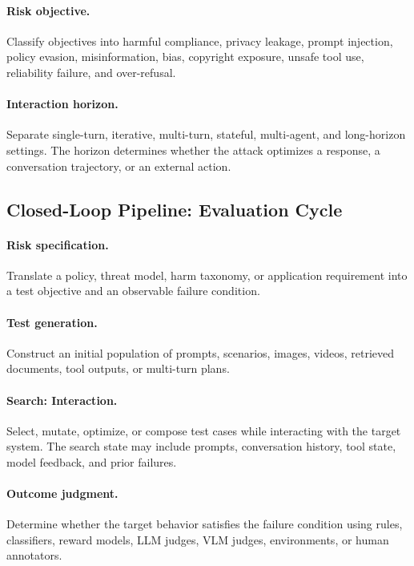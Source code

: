 \documentclass[review]{fcs}
\begin{document}
\paragraph{Risk objective.}
Classify objectives into harmful compliance, privacy leakage, prompt injection, policy evasion, misinformation, bias, copyright exposure, unsafe tool use, reliability failure, and over-refusal.

\paragraph{Interaction horizon.}
Separate single-turn, iterative, multi-turn, stateful, multi-agent, and long-horizon settings. The horizon determines whether the attack optimizes a response, a conversation trajectory, or an external action.

\subsection{Closed-Loop Pipeline: Evaluation Cycle}

\paragraph{Risk specification.}
Translate a policy, threat model, harm taxonomy, or application requirement into a test objective and an observable failure condition.

\paragraph{Test generation.}
Construct an initial population of prompts, scenarios, images, videos, retrieved documents, tool outputs, or multi-turn plans.

\paragraph{Search: Interaction.}
Select, mutate, optimize, or compose test cases while interacting with the target system. The search state may include prompts, conversation history, tool state, model feedback, and prior failures.

\paragraph{Outcome judgment.}
Determine whether the target behavior satisfies the failure condition using rules, classifiers, reward models, LLM judges, VLM judges, environments, or human annotators.
\end{document}
